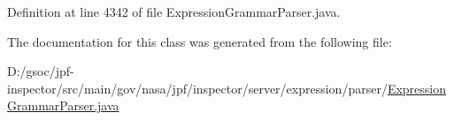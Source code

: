 Definition at line 4342 of file Expression\+Grammar\+Parser.\+java.



The documentation for this class was generated from the following file\+:\begin{DoxyCompactItemize}
\item 
D\+:/gsoc/jpf-\/inspector/src/main/gov/nasa/jpf/inspector/server/expression/parser/\hyperlink{_expression_grammar_parser_8java}{Expression\+Grammar\+Parser.\+java}\end{DoxyCompactItemize}
